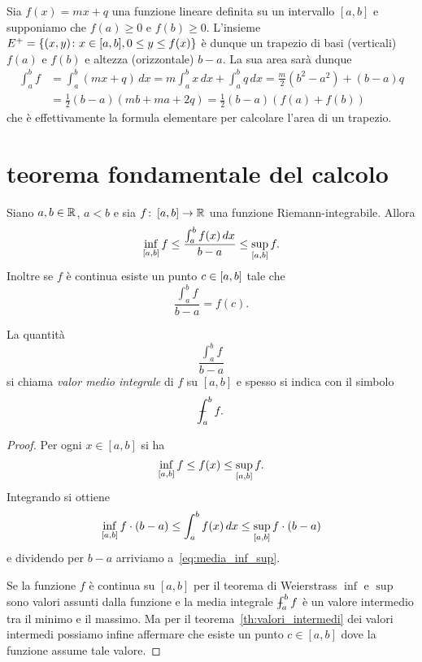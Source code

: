 \begin{example}
Sia $f(x) = mx + q$ una funzione lineare definita 
su un intervallo $[a,b]$ e supponiamo che $f(a)\ge 0$ 
e $f(b)\ge 0$.
L'insieme $E^+={\left\{ (x,y)\colon x\in [a,b], 0\le y \le f(x) \right\}}$
è dunque un trapezio di basi (verticali) $f(a)$ e $f(b)$
e altezza (orizzontale) $b-a$. La sua area sarà dunque 
\begin{align*}
  \int_a^b f 
  &= \int_a^b (mx+q)\, dx 
  = m\int_a^b x\, dx + \int_a^b q\, dx
  = \frac{m}{2}(b^2-a^2) + (b-a) q\\ 
  &= \frac 1 2 (b-a)(mb+ma+2q)
  = \frac 1 2 (b-a)(f(a) + f(b))
\end{align*}
che è effettivamente la formula elementare per 
calcolare l'area di un trapezio.
\end{example}

\section{teorema fondamentale del calcolo}

\begin{theorem}%
  \label{th:media_integrale}%
  \mymark{***}%
  Siano $a,b\in {\mathbb R}$, $a<b$ e sia
  $f\colon \left[a,b\right] \to {\mathbb R}$ una funzione Riemann-integrabile.
  Allora
  \begin{equation}\label{eq:media_inf_sup}
    \inf_{\left[a,b\right]} f 
    \le \frac{\int_a^b f(x)\, dx}{b-a} 
    \le \sup_{\left[a,b\right]} f.
  \end{equation}
  Inoltre se $f$ è continua 
  esiste un punto $c \in \left[a,b\right]$
  tale che
  \[
  \frac{\int_a^b f}{b-a} = f(c).
  \]
  \end{theorem}
  La quantità
  \[
    \frac{\int_a^b f}{b-a}
  \]
  si chiama \emph{valor medio integrale} di $f$ su $[a,b]$ e spesso
  si indica con il simbolo
  \[
    \dashint_a^b f.
  \]
  \begin{proof}
  \mymark{***}
  Per ogni $x\in [a,b]$ si ha 
  \[
    \inf_{\left[a,b\right]} f \le f(x) \le \sup_{\left[a,b\right]}f.
  \]
  Integrando si ottiene
  \[
    \inf_{\left[a,b\right]} f \cdot (b-a)
    \le \int_a^b f(x)\, dx 
    \le \sup_{\left[a,b\right]}f\cdot (b-a)
  \]
  e dividendo per $b-a$ arriviamo a~\eqref{eq:media_inf_sup}.

  Se la funzione $f$ è continua su $[a,b]$ per il teorema di Weierstrass 
  $\inf$ e $\sup$ sono valori assunti dalla funzione 
  e la media integrale $\dashint_a^b f$ è un valore intermedio tra il 
  minimo e il massimo.
  Ma per il teorema~\ref{th:valori_intermedi} dei valori intermedi 
  possiamo infine affermare che esiste un punto $c\in [a,b]$
  dove la funzione assume tale valore.
\end{proof}
  
